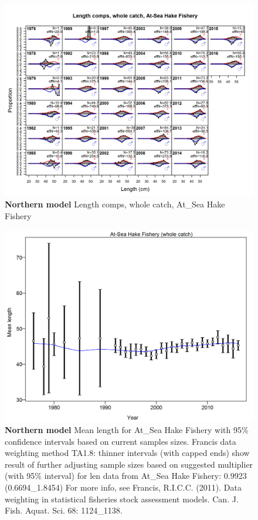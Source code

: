 \documentclass[12pt,]{article}
\begin{document}
\begin{figure}[htbp]
\centering
\includegraphics{./r4ss/plots_mod1/comp_lenfit_flt2mkt0.png}
\caption{\textbf{Northern model} Length comps, whole catch, At\_Sea Hake
Fishery \label{fig:mod1_10_comp_lenfit_flt2mkt0}}
\end{figure}

\begin{figure}[htbp]
\centering
\includegraphics{./r4ss/plots_mod1/comp_lenfit_data_weighting_TA1.8_At-Sea Hake Fishery.png}
\caption{\textbf{Northern model} Mean length for At\_Sea Hake Fishery
with 95\% confidence intervals based on current samples sizes. Francis
data weighting method TA1.8: thinner intervals (with capped ends) show
result of further adjusting sample sizes based on suggested multiplier
(with 95\% interval) for len data from At\_Sea Hake Fishery: 0.9923
(0.6694\_1.8454) For more info, see Francis, R.I.C.C. (2011). Data
weighting in statistical fisheries stock assessment models. Can. J.
Fish. Aquat. Sci. 68: 1124\_1138.
\label{fig:mod1_13_comp_lenfit_data_weighting_TA1.8_At-Sea Hake Fishery}}
\end{figure}
\end{document}

